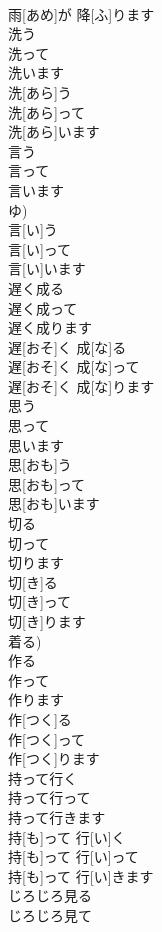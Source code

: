 \documentclass[8pt]{extreport}
\begin{document}
\begin{CJK}{UTF8}{min}
\\	雨[あめ]が 降[ふ]ります	
\\	洗う 
\\	洗って 
\\	洗います	
\\	洗[あら]う 
\\	洗[あら]って 
\\	洗[あら]います	
\\	言う 
\\	言って 
\\	言います 
\\	ゆ)	
\\	言[い]う 
\\	言[い]って 
\\	言[い]います	
\\	遅く成る 
\\	遅く成って 
\\	遅く成ります	
\\	遅[おそ]く 成[な]る 
\\	遅[おそ]く 成[な]って 
\\	遅[おそ]く 成[な]ります	
\\	思う 
\\	思って 
\\	思います	
\\	思[おも]う 
\\	思[おも]って 
\\	思[おも]います	
\\	切る 
\\	切って 
\\	切ります	
\\	切[き]る 
\\	切[き]って 
\\	切[き]ります 
\\	着る)	
\\	作る 
\\	作って 
\\	作ります	
\\	作[つく]る 
\\	作[つく]って 
\\	作[つく]ります	
\\	持って行く 
\\	持って行って 
\\	持って行きます	
\\	持[も]って 行[い]く 
\\	持[も]って 行[い]って 
\\	持[も]って 行[い]きます	
\\	じろじろ見る 
\\	じろじろ見て 

\end{CJK}
\end{document}

